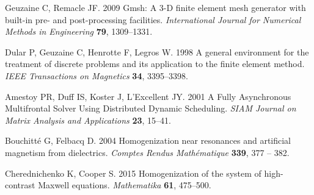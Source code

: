 \documentclass[aps,prb,11pt]{revtex4-1}
\begin{document}
\begin{thebibliography}{99}
Geuzaine C, Remacle JF. 2009  Gmsh: {A} 3-{D} finite element mesh generator
  with built-in pre- and post-processing facilities. {\em International Journal
  for Numerical Methods in Engineering} \textbf{79}, 1309--1331.

Dular P, Geuzaine C, Henrotte F, Legros W. 1998  A general environment for the
  treatment of discrete problems and its application to the finite element
  method. {\em IEEE Transactions on Magnetics} \textbf{34}, 3395--3398.

Amestoy PR, Duff IS, Koster J, L'Excellent JY. 2001  A {Fully} {Asynchronous}
  {Multifrontal} {Solver} {Using} {Distributed} {Dynamic} {Scheduling}. {\em
  SIAM Journal on Matrix Analysis and Applications} \textbf{23}, 15--41.

Bouchitté G, Felbacq D. 2004  Homogenization near resonances and artificial
  magnetism from dielectrics. {\em Comptes Rendus Mathématique} \textbf{339},
  377 -- 382.

Cherednichenko K, Cooper S. 2015  Homogenization of the system of high-contrast
  {Maxwell} equations. {\em Mathematika} \textbf{61}, 475--500.

\end{thebibliography}


% 
% 
\end{document}
